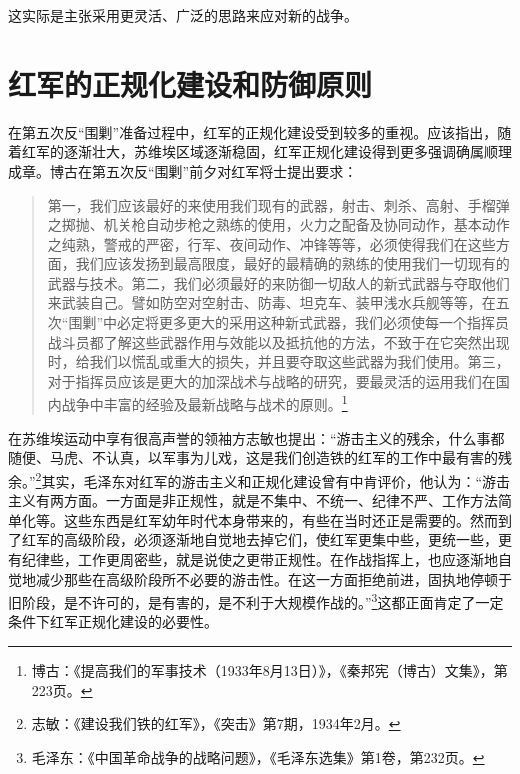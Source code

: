 这实际是主张采用更灵活、广泛的思路来应对新的战争。

\section{红军的正规化建设和防御原则}


在第五次反“围剿”准备过程中，红军的正规化建设受到较多的重视。应该指出，随着红军的逐渐壮大，苏维埃区域逐渐稳固，红军正规化建设得到更多强调确属顺理成章。博古在第五次反“围剿”前夕对红军将士提出要求：

\begin{quote}

第一，我们应该最好的来使用我们现有的武器，射击、刺杀、高射、手榴弹之掷抛、机关枪自动步枪之熟练的使用，火力之配备及协同动作，基本动作之纯熟，警戒的严密，行军、夜间动作、冲锋等等，必须使得我们在这些方面，我们应该发扬到最高限度，最好的最精确的熟练的使用我们一切现有的武器与技术。第二，我们必须最好的来防御一切敌人的新式武器与夺取他们来武装自己。譬如防空对空射击、防毒、坦克车、装甲浅水兵舰等等，在五次“围剿”中必定将更多更大的采用这种新式武器，我们必须使每一个指挥员战斗员都了解这些武器作用与效能以及抵抗他的方法，不致于在它突然出现时，给我们以慌乱或重大的损失，并且要夺取这些武器为我们使用。第三，对于指挥员应该是更大的加深战术与战略的研究，要最灵活的运用我们在国内战争中丰富的经验及最新战略与战术的原则。\footnote{博古：《提高我们的军事技术（1933年8月13日）》，《秦邦宪（博古）文集》，第223页。}
\end{quote}


在苏维埃运动中享有很高声誉的领袖方志敏也提出：“游击主义的残余，什么事都随便、马虎、不认真，以军事为儿戏，这是我们创造铁的红军的工作中最有害的残余。”\footnote{志敏：《建设我们铁的红军》，《突击》第7期，1934年2月。}其实，毛泽东对红军的游击主义和正规化建设曾有中肯评价，他认为：“游击主义有两方面。一方面是非正规性，就是不集中、不统一、纪律不严、工作方法简单化等。这些东西是红军幼年时代本身带来的，有些在当时还正是需要的。然而到了红军的高级阶段，必须逐渐地自觉地去掉它们，使红军更集中些，更统一些，更有纪律些，工作更周密些，就是说使之更带正规性。在作战指挥上，也应逐渐地自觉地减少那些在高级阶段所不必要的游击性。在这一方面拒绝前进，固执地停顿于旧阶段，是不许可的，是有害的，是不利于大规模作战的。”\footnote{毛泽东：《中国革命战争的战略问题》，《毛泽东选集》第1卷，第232页。}这都正面肯定了一定条件下红军正规化建设的必要性。


